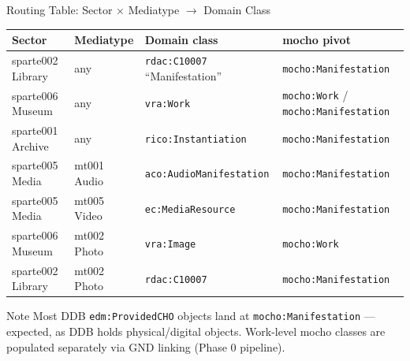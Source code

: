 \documentclass[xcolor,aspectratio=169,compress]{beamer}
\begin{document}
\begin{frame}{Routing Table: Sector $\times$ Mediatype $\to$ Domain Class}
  \small
  \begin{center}
  \begin{tabular}{llll}
    \toprule
    Sector & Mediatype & Domain class & mocho pivot \\
    \midrule
    sparte002 Library  & any         & \texttt{rdac:C10007} ``Manifestation'' & \texttt{mocho:Manifestation} \\
    sparte006 Museum   & any         & \texttt{vra:Work}                      & \texttt{mocho:Work} / \texttt{mocho:Manifestation} \\
    sparte001 Archive  & any         & \texttt{rico:Instantiation}            & \texttt{mocho:Manifestation} \\
    sparte005 Media    & mt001 Audio & \texttt{aco:AudioManifestation}        & \texttt{mocho:Manifestation} \\
    sparte005 Media    & mt005 Video & \texttt{ec:MediaResource}              & \texttt{mocho:Manifestation} \\
    sparte006 Museum   & mt002 Photo & \texttt{vra:Image}                     & \texttt{mocho:Work} \\
    sparte002 Library  & mt002 Photo & \texttt{rdac:C10007}                   & \texttt{mocho:Manifestation} \\
    \bottomrule
  \end{tabular}
  \end{center}
  \smallskip
  \begin{block}{Note}
    \small Most DDB \texttt{edm:ProvidedCHO} objects land at \texttt{mocho:Manifestation} ---
    expected, as DDB holds physical/digital objects.
    Work-level mocho classes are populated separately via GND linking (Phase 0 pipeline).
  \end{block}
\end{frame}
\end{document}
